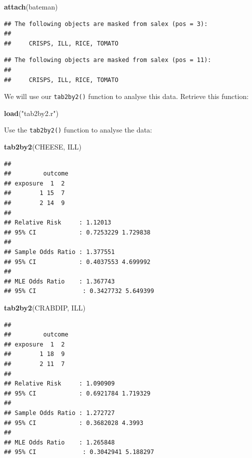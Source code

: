 \documentclass[12pt,]{book}
\newenvironment{Shaded}{\begin{snugshade}}{\end{snugshade}}
\newcommand{\KeywordTok}[1]{\textcolor[rgb]{0.13,0.29,0.53}{\textbf{#1}}}
\newcommand{\StringTok}[1]{\textcolor[rgb]{0.31,0.60,0.02}{#1}}
\newcommand{\NormalTok}[1]{#1}
\theoremstyle{definition}
\theoremstyle{definition}
\theoremstyle{definition}
\theoremstyle{remark}
\begin{document}
\begin{Shaded}
\begin{Highlighting}[]
\KeywordTok{attach}\NormalTok{(bateman)}
\end{Highlighting}
\end{Shaded}

\begin{verbatim}
## The following objects are masked from salex (pos = 3):
## 
##     CRISPS, ILL, RICE, TOMATO
\end{verbatim}

\begin{verbatim}
## The following objects are masked from salex (pos = 11):
## 
##     CRISPS, ILL, RICE, TOMATO
\end{verbatim}

We will use our \texttt{tab2by2()} function to analyse this data.
Retrieve this function:

\begin{Shaded}
\begin{Highlighting}[]
\KeywordTok{load}\NormalTok{(}\StringTok{"tab2by2.r"}\NormalTok{)}
\end{Highlighting}
\end{Shaded}

Use the \texttt{tab2by2()} function to analyse the data:

\begin{Shaded}
\begin{Highlighting}[]
\KeywordTok{tab2by2}\NormalTok{(CHEESE, ILL)}
\end{Highlighting}
\end{Shaded}

\begin{verbatim}
## 
##         outcome
## exposure  1  2
##        1 15  7
##        2 14  9
## 
## Relative Risk     : 1.12013 
## 95% CI            : 0.7253229 1.729838 
## 
## Sample Odds Ratio : 1.377551 
## 95% CI            : 0.4037553 4.699992 
## 
## MLE Odds Ratio    : 1.367743 
## 95% CI             : 0.3427732 5.649399
\end{verbatim}

\begin{Shaded}
\begin{Highlighting}[]
\KeywordTok{tab2by2}\NormalTok{(CRABDIP, ILL)}
\end{Highlighting}
\end{Shaded}

\begin{verbatim}
## 
##         outcome
## exposure  1  2
##        1 18  9
##        2 11  7
## 
## Relative Risk     : 1.090909 
## 95% CI            : 0.6921784 1.719329 
## 
## Sample Odds Ratio : 1.272727 
## 95% CI            : 0.3682028 4.3993 
## 
## MLE Odds Ratio    : 1.265848 
## 95% CI             : 0.3042941 5.188297
\end{verbatim}
\end{document}
